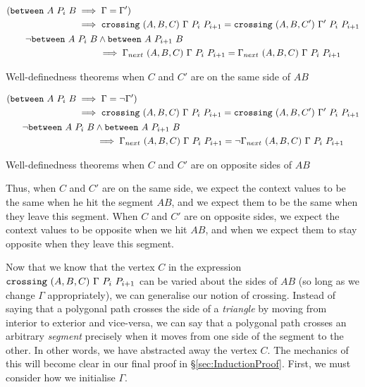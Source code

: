 \begin{boxedfigure}
  \begin{gather}
    \begin{split}
      (\texttt{between}\ A\ P_i\ B&\implies \Gamma = \Gamma')\\
      &\implies\texttt{crossing}\ (A,B,C)\ \Gamma\ P_i\ P_{i+1} = \texttt{crossing}\ (A,B,C')\ \Gamma'\ P_i\ P_{i+1}
    \end{split}\\
    \begin{split}
      \neg\texttt{between}\ A\ P_i\ B&\wedge\texttt{between}\ A\ P_{i+1}\ B\\
      &\implies \Gamma_{next}\ (A,B,C)\ \Gamma\ P_i\ P_{i+1} = \Gamma_{next}\ (A,B,C)\ \Gamma\ P_i\ P_{i+1}
    \end{split}
  \end{gather}
  \caption{Well-definedness theorems when $C$ and $C'$ are on the same side of $AB$}
  \label{fig:CrossChange1}
\end{boxedfigure}

\begin{boxedfigure}
  \begin{gather}
    \begin{split}
      (\texttt{between}\ A\ P_i\ B&\implies \Gamma = \neg\Gamma')\\
      &\implies\texttt{crossing}\ (A,B,C)\ \Gamma\ P_i\ P_{i+1} = \texttt{crossing}\ (A,B,C')\ \Gamma'\ P_i\ P_{i+1}
    \end{split}\\
    \begin{split}
      \neg\texttt{between}\ A\ P_i\ B&\wedge\texttt{between}\ A\ P_{i+1}\ B\\
      &\implies \Gamma_{next}\ (A,B,C)\ \Gamma\ P_i\ P_{i+1} = \neg\Gamma_{next}\ (A,B,C)\ \Gamma\ P_i\ P_{i+1}
    \end{split}
  \end{gather}
  \caption{Well-definedness theorems when $C$ and $C'$ are on opposite sides of $AB$}
  \label{fig:CrossChange2}
\end{boxedfigure}

Thus, when $C$ and $C'$ are on the same side, we expect the context values to be the same when he hit the segment $AB$, and we expect them to be the same when they leave this segment. When $C$ and $C'$ are on opposite sides, we expect the context values to be opposite when we hit $AB$, and when we expect them to stay opposite when they leave this segment. 

Now that we know that the vertex $C$ in the expression $\code{crossing}\ (A,B,C)\ \Gamma\ P_i\ P_{i+1}$ can be varied about the sides of $AB$ (so long as we change $\Gamma$ appropriately), we can generalise our notion of crossing. Instead of saying that a polygonal path crosses the side of a  \emph{triangle} by moving from interior to exterior and vice-versa, we can say that a polygonal path crosses an arbitrary \emph{segment} precisely when it moves from one side of the segment to the other. In other words, we have abstracted away the vertex $C$. The mechanics of this will become clear in our final proof in \S\ref{sec:InductionProof}. First, we must consider how we initialise $\Gamma$.

